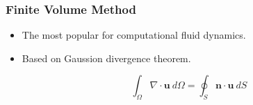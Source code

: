 \begin{frame}[fragile]
\frametitle{Finite Volume Method}
\begin{itemize}
\item The most popular for computational fluid dynamics.
\item Based on Gaussion divergence theorem.
\begin{fleqn}
\begin{equation}
\int_{\Omega} \nabla \cdot \mathbf{u} \ d\Omega = \oint_{S} \mathbf{n} \cdot \mathbf{u} \ dS
\end{equation}
\end{fleqn}


\end{itemize}

\end{frame}